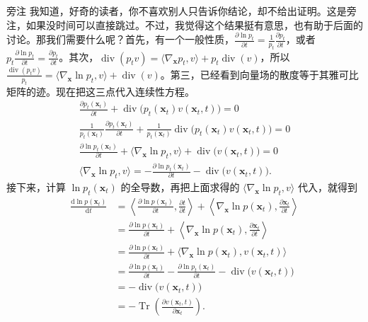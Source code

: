 \begin{booknote}{旁注}
我知道，好奇的读者，你不喜欢别人只告诉你结论，却不给出证明。这是旁注，如果没时间可以直接跳过。不过，我觉得这个结果挺有意思，也有助于后面的讨论。那我们需要什么呢？首先，有一个一般性质，$\frac{\partial\ln p_t}{\partial t}=\frac{1}{p_t}\frac{\partial p_t}{\partial t}$，或者 $p_t\frac{\partial\ln p_t}{\partial t}=\frac{\partial p_t}{\partial t}$。其次，$\operatorname{div}(p_tv)=\langle\nabla_{\mathbf x}p_t,v\rangle+p_t\operatorname{div}(v)$，所以 $\frac{\operatorname{div}(p_tv)}{p_t}=\langle\nabla_{\mathbf x}\ln p_t,v\rangle+\operatorname{div}(v)$。第三，已经看到向量场的散度等于其雅可比矩阵的迹。现在把这三点代入连续性方程。
\begin{gather}
  \frac{\partial p_t(\mathbf x_t)}{\partial t}+
  \operatorname{div}\bigl(p_t(\mathbf x_t)v(\mathbf x_t,t)\bigr)=0
  \tag{9.42}\label{eq:09-42}\\
  \frac{1}{p_t(\mathbf x_t)}\frac{\partial p_t(\mathbf x_t)}{\partial t}+
  \frac{1}{p_t(\mathbf x_t)}\operatorname{div}\bigl(p_t(\mathbf x_t)v(\mathbf x_t,t)\bigr)=0
  \tag{9.43}\label{eq:09-43}\\
  \frac{\partial\ln p_t(\mathbf x_t)}{\partial t}+
  \langle\nabla_{\mathbf x}\ln p_t,v\rangle+\operatorname{div}\bigl(v(\mathbf x_t,t)\bigr)=0
  \tag{9.44}\label{eq:09-44}\\
  \langle\nabla_{\mathbf x}\ln p_t,v\rangle=
  -\frac{\partial\ln p_t(\mathbf x_t)}{\partial t}-\operatorname{div}\bigl(v(\mathbf x_t,t)\bigr).
  \tag{9.45}\label{eq:09-45}
\end{gather}
接下来，计算 $\ln p_t(\mathbf x_t)$ 的全导数，再把上面求得的 $\langle\nabla_{\mathbf x}\ln p_t,v\rangle$ 代入，就得到
\begin{align}
  \frac{\mathrm d\ln p(\mathbf x_t)}{\mathrm dt}
  &=\left\langle\frac{\partial\ln p(\mathbf x_t)}{\partial t},
    \frac{\partial t}{\partial t}\right\rangle+
    \left\langle\nabla_{\mathbf x}\ln p(\mathbf x_t),
    \frac{\partial\mathbf x_t}{\partial t}\right\rangle
    \tag{9.46}\label{eq:09-46}\\
  &=\frac{\partial\ln p(\mathbf x_t)}{\partial t}+
    \left\langle\nabla_{\mathbf x}\ln p(\mathbf x_t),
    \frac{\partial\mathbf x_t}{\partial t}\right\rangle
    \tag{9.47}\label{eq:09-47}\\
  &=\frac{\partial\ln p(\mathbf x_t)}{\partial t}+
    \bigl\langle\nabla_{\mathbf x}\ln p(\mathbf x_t),v(\mathbf x_t,t)\bigr\rangle
    \tag{9.48}\label{eq:09-48}\\
  &=\frac{\partial\ln p(\mathbf x_t)}{\partial t}-
    \frac{\partial\ln p_t(\mathbf x_t)}{\partial t}
    -\operatorname{div}\bigl(v(\mathbf x_t,t)\bigr)
    \tag{9.49}\label{eq:09-49}\\
  &=-\operatorname{div}\bigl(v(\mathbf x_t,t)\bigr)
    \tag{9.50}\label{eq:09-50}\\
  &=-\operatorname{Tr}\left(\frac{\partial v(\mathbf x_t,t)}{\partial\mathbf x_t}\right).
    \tag{9.51}\label{eq:09-51}
\end{align}
\end{booknote}

